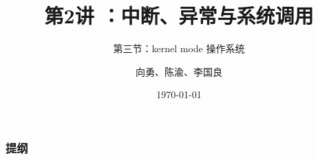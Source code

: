 


\title[第2讲]{第2讲 ：中断、异常与系统调用 } %
\subtitle{第三节：kernel mode 操作系统}
\author{向勇、陈渝、李国良} %
\date{\today} %



\begin{frame}
\titlepage %
\end{frame}


\begin{frame}
    \frametitle{提纲} 
    \tableofcontents 
\end{frame}





